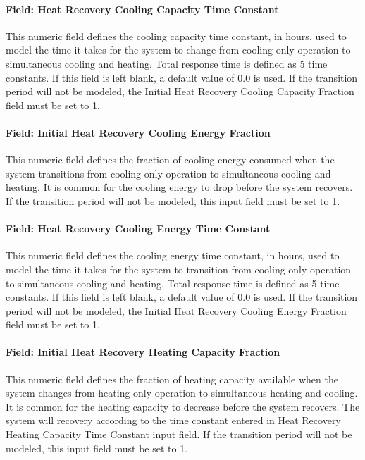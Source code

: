 \paragraph{Field: Heat Recovery Cooling Capacity Time Constant}

This numeric field defines the cooling capacity time constant, in hours, used to model the time it takes for the system to change from cooling only operation to simultaneous cooling and heating. Total response time is defined as 5 time constants. If this field is left blank, a default value of 0.0 is used. If the transition period will not be modeled, the Initial Heat Recovery Cooling Capacity Fraction field must be set to 1.

\paragraph{Field: Initial Heat Recovery Cooling Energy Fraction}

This numeric field defines the fraction of cooling energy consumed when the system transitions from cooling only operation to simultaneous cooling and heating. It is common for the cooling energy to drop before the system recovers. If the transition period will not be modeled, this input field must be set to 1.

\paragraph{Field: Heat Recovery Cooling Energy Time Constant}

This numeric field defines the cooling energy time constant, in hours, used to model the time it takes for the system to transition from cooling only operation to simultaneous cooling and heating. Total response time is defined as 5 time constants. If this field is left blank, a default value of 0.0 is used. If the transition period will not be modeled, the Initial Heat Recovery Cooling Energy Fraction field must be set to 1.

\paragraph{Field: Initial Heat Recovery Heating Capacity Fraction}

This numeric field defines the fraction of heating capacity available when the system changes from heating only operation to simultaneous heating and cooling. It is common for the heating capacity to decrease before the system recovers. The system will recovery according to the time constant entered in Heat Recovery Heating Capacity Time Constant input field. If the transition period will not be modeled, this input field must be set to 1.

